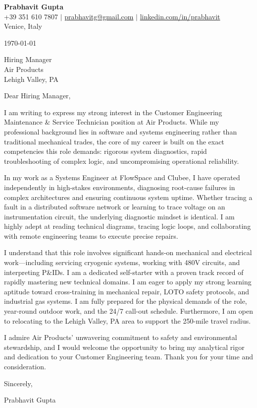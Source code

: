 \documentclass[11pt,a4paper]{article}
\begin{document}
\begin{center}
    {\Huge \bfseries Prabhavit Gupta} \\ \vspace{5pt}
    +39 351 610 7807 $\vert$ \href{mailto:prabhavitg@gmail.com}{prabhavitg@gmail.com} $\vert$ \href{https://www.linkedin.com/in/prabhavit/}{linkedin.com/in/prabhavit} \\
    Venice, Italy
\end{center}

\vspace{2em}

\today

\vspace{1em}
Hiring Manager \\
Air Products \\
Lehigh Valley, PA

\vspace{1em}
Dear Hiring Manager,

I am writing to express my strong interest in the Customer Engineering Maintenance \& Service Technician position at Air Products. While my professional background lies in software and systems engineering rather than traditional mechanical trades, the core of my career is built on the exact competencies this role demands: rigorous system diagnostics, rapid troubleshooting of complex logic, and uncompromising operational reliability.

In my work as a Systems Engineer at FlowSpace and Clubee, I have operated independently in high-stakes environments, diagnosing root-cause failures in complex architectures and ensuring continuous system uptime. Whether tracing a fault in a distributed software network or learning to trace voltage on an instrumentation circuit, the underlying diagnostic mindset is identical. I am highly adept at reading technical diagrams, tracing logic loops, and collaborating with remote engineering teams to execute precise repairs. 

I understand that this role involves significant hands-on mechanical and electrical work—including servicing cryogenic systems, working with 480V circuits, and interpreting P\&IDs. I am a dedicated self-starter with a proven track record of rapidly mastering new technical domains. I am eager to apply my strong learning aptitude toward cross-training in mechanical repair, LOTO safety protocols, and industrial gas systems. I am fully prepared for the physical demands of the role, year-round outdoor work, and the 24/7 call-out schedule. Furthermore, I am open to relocating to the Lehigh Valley, PA area to support the 250-mile travel radius.

I admire Air Products' unwavering commitment to safety and environmental stewardship, and I would welcome the opportunity to bring my analytical rigor and dedication to your Customer Engineering team. Thank you for your time and consideration.

Sincerely,

Prabhavit Gupta
\end{document}
